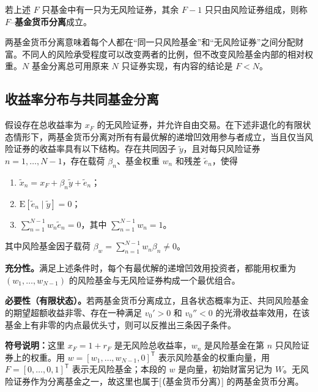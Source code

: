 \begin{tcolorbox}[knowledge]
 若上述 $F$ 只基金中有一只为无风险证券，其余 $F-1$ 只只由风险证券组成，则称 $F$--\textbf{基金货币分离}成立。
\end{tcolorbox}
两基金货币分离意味着每个人都在“同一只风险基金”和“无风险证券”之间分配财富。不同人的风险承受程度可以改变两者的比例，但不改变风险基金内部的相对权重。$N$ 基金分离总可用原来 $N$ 只证券实现，有内容的结论是 $F<N$。

\subsection{收益率分布与共同基金分离}
\begin{tcolorbox}[knowledge]
 假设存在总收益率为 $x_F$ 的无风险证券，并允许自由交易。在下述非退化的有限状态情形下，两基金货币分离对所有有最优解的递增凹效用参与者成立，当且仅当风险证券的收益率具有以下结构。存在共同因子 $\tilde y$，且对每只风险证券 $n=1,\ldots,N-1$，存在载荷 $\beta_n$、基金权重 $w_n$ 和残差 $\tilde e_n$，使得
\begin{enumerate}[ref=\arabic*]
 \item $\displaystyle \tilde x_n=x_F+\beta_n\tilde y+\tilde e_n$；
 \item\label{item:wj-nine-ross-zero-conditional-mean} $\displaystyle \mathrm E[\tilde e_n\mid\tilde y]=0$；
 \item\label{item:wj-nine-ross-zero-fund-residual} $\displaystyle \sum_{n=1}^{N-1}w_n\tilde e_n=0$，其中
       $\displaystyle \sum_{n=1}^{N-1}w_n=1$。
\end{enumerate}
其中风险基金因子载荷 $\beta_w=\sum_{n=1}^{N-1}w_n\beta_n\ne0$。

\textbf{充分性。}满足上述条件时，每个有最优解的递增凹效用投资者，都能用权重为 $(w_1,\ldots,w_{N-1})$ 的风险基金与无风险证券构成一个最优组合。

\textbf{必要性（有限状态）。}若两基金货币分离成立，且各状态概率为正、共同风险基金的期望超额收益非零、存在一种满足 $v_0'>0$ 和 $v_0''<0$ 的光滑收益率效用，在该基金上有非零的内点最优头寸，则可以反推出三条因子条件。
\end{tcolorbox}

\textbf{符号说明：}这里 $x_F=1+r_F$ 是无风险总收益率，$w_n$ 是风险基金在第 $n$ 只风险证券上的权重。用 $w=[w_1,\ldots,w_{N-1},0]^{\mathsf T}$ 表示风险基金的权重向量，用 $F=[0,\ldots,0,1]^{\mathsf T}$ 表示无风险基金；本段的 $w$ 是向量，初始财富另记为 $W$。无风险证券作为分离基金之一，故这里也属于[（基金货币分离）] 的两基金货币分离。

